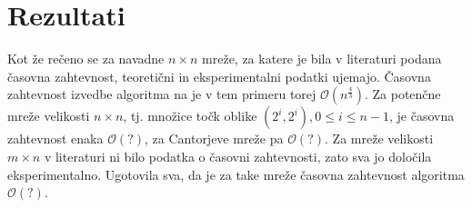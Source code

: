 \documentclass[a4paper]{article}
\begin{document}
\section{Rezultati}
Kot že rečeno se za navadne $n \times n$ mreže, za katere je bila v literaturi podana časovna zahtevnost, teoretični in eksperimentalni podatki ujemajo. Časovna zahtevnost izvedbe algoritma na
je v tem primeru torej $\mathcal{O}(n ^ \frac{4}{3})$. Za potenčne mreže velikosti $n \times n$, tj. množice točk oblike $(2^i, 2^i), 0 \leq i \leq n - 1$, je časovna zahtevnost enaka
$\mathcal{O}(?)$, za Cantorjeve mreže pa $\mathcal{O}(?)$.
Za mreže velikosti $m \times n$ v literaturi ni bilo podatka o časovni zahtevnosti, zato sva jo določila eksperimentalno. Ugotovila sva, da je za take mreže časovna zahtevnost algoritma 
$\mathcal{O}(?)$. 
\end{document}
